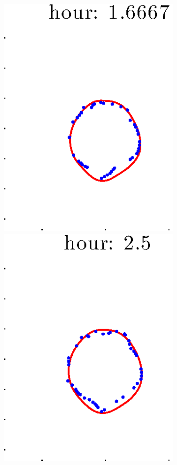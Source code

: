 \documentclass[12pt]{article}
\begin{document}
\begin{figure}[h!]
\begin{subfigure}[b]{.3\textwidth}
		\includegraphics[height=.15\textheight]{Pos14exp8/firsthalf/full3.eps}
		\includegraphics[height=.15\textheight]{Pos14exp8/firsthalf/full4.eps}

\end{subfigure}
\end{figure}
\end{document}
